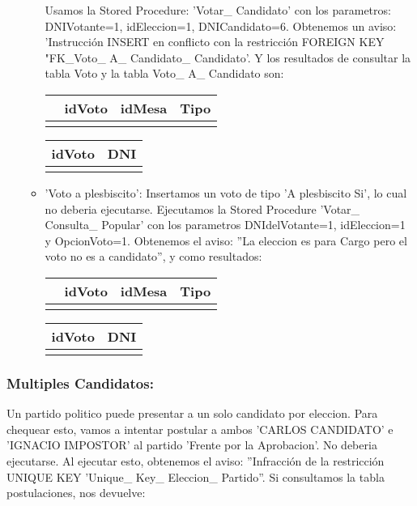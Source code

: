 \begin{enumerate}
\begin{itemize}
	Usamos la Stored Procedure: 'Votar\_ Candidato' con los parametros: DNIVotante=1, idEleccion=1, DNICandidato=6. Obtenemos un aviso: 'Instrucción INSERT en conflicto con la restricción FOREIGN KEY "FK\_Voto\_ A\_ Candidato\_ Candidato'. Y los resultados de consultar la tabla Voto y la tabla Voto\_ A\_ Candidato son:
	
	
	\begin{tabular}{| l| l| l| l| }
	\hline 
	   & idVoto & idMesa & Tipo \\
	  \hline 
	   & & & \\
	   \hline 
	\end{tabular}
	\vspace{2mm}	
	
	
	\begin{tabular}{| l| l|}
	\hline 
	idVoto & DNI \\
	\hline 
	 & \\
	\hline 
	\end{tabular}
		
	\item 'Voto a plesbiscito': Insertamos un voto
	de tipo 'A plesbiscito Si', lo cual no deberia ejecutarse. Ejecutamos la Stored Procedure 'Votar\_ Consulta\_ Popular' con los parametros DNIdelVotante=1, idEleccion=1 y OpcionVoto=1. Obtenemos el aviso: ''La eleccion es para Cargo pero el voto no es a candidato'', y como resultados:
	
	\begin{tabular}{| l| l| l| l| }
	\hline 
	   & idVoto & idMesa & Tipo \\
	  \hline 
	   & & & \\
	   \hline 
	\end{tabular}
	\vspace{2mm}	
	
	
	\begin{tabular}{| l| l|}
	\hline 
	idVoto & DNI \\
	\hline 
	 & \\
	\hline 
	\end{tabular}
			
	\end{itemize}
\end{enumerate}
\subsubsection{Multiples Candidatos:} Un partido politico puede presentar a un solo candidato por eleccion. Para chequear esto, vamos a intentar postular a ambos 'CARLOS CANDIDATO' e 'IGNACIO IMPOSTOR' al partido 'Frente por la Aprobacion'. No deberia ejecutarse. Al ejecutar esto, obtenemos el aviso: ''Infracción de la restricción UNIQUE KEY 'Unique\_ Key\_ Eleccion\_ Partido''. Si consultamos la tabla postulaciones, nos devuelve:
\vspace{2mm}
	
